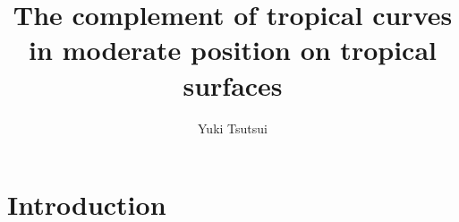\documentclass[a4paper,dvipdfmx,reqno,12pt]{amsart}
\title{The complement of tropical curves in moderate position on
tropical surfaces}
\author[Y. Tsutsui]{Yuki Tsutsui}
\theoremstyle{definition}
\newcommand{\opn}[1]{\operatorname{#1}}
\numberwithin{equation}{section}
\begin{document}
\maketitle

\begin{abstract}


\end{abstract}
\section{Introduction}
\end{document}
